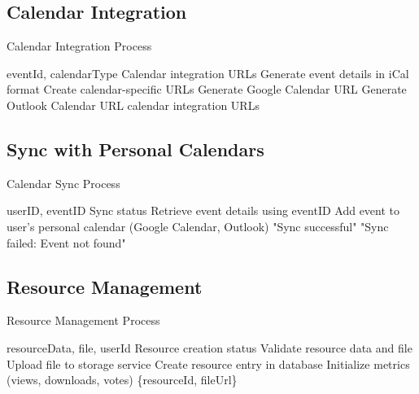 \subsection{Calendar Integration}
\begin{algorithm}[H]
\caption{Calendar Integration Process}\label{alg:calendar}
\begin{algorithmic}[1]
\Require eventId, calendarType
\Ensure Calendar integration URLs
\State Generate event details in iCal format
\State Create calendar-specific URLs
    \State Generate Google Calendar URL
    \State Generate Outlook Calendar URL
\EndIf
\State \Return calendar integration URLs
\end{algorithmic}
\end{algorithm}

\subsection{Sync with Personal Calendars}
\begin{algorithm}[H]
\caption{Calendar Sync Process}\label{alg:calendar_sync}
\begin{algorithmic}[1]
\Require userID, eventID
\Ensure Sync status
\State Retrieve event details using eventID
    \State Add event to user's personal calendar (Google Calendar, Outlook)
    \State \Return "Sync successful"
\Else
    \State \Return "Sync failed: Event not found"
\EndIf
\end{algorithmic}
\end{algorithm}

\subsection{Resource Management}
\begin{algorithm}[H]
\caption{Resource Management Process}\label{alg:resource}
\begin{algorithmic}[1]
\Require resourceData, file, userId
\Ensure Resource creation status
\State Validate resource data and file
\State Upload file to storage service
\State Create resource entry in database
\State Initialize metrics (views, downloads, votes)
\State \Return \{resourceId, fileUrl\}
\end{algorithmic}
\end{algorithm}

